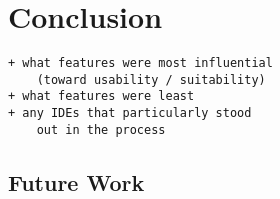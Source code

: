 \section{Conclusion}
\label{sec:conclusion}

\begin{verbatim}
+ what features were most influential
    (toward usability / suitability)
+ what features were least
+ any IDEs that particularly stood
    out in the process
\end{verbatim}



\subsection{Future Work}
\label{subsec:future_work}
